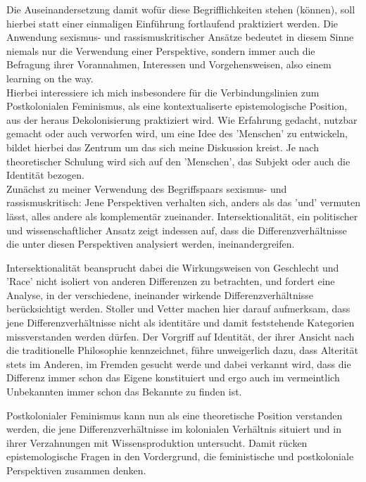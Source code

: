 Die Auseinandersetzung damit wofür diese
Begrifflichkeiten stehen (können), soll hierbei statt einer einmaligen
Einführung fortlaufend praktiziert werden. Die Anwendung sexismus- und
rassismuskritischer Ansätze bedeutet in diesem Sinne niemals nur die Verwendung
einer Perspektive, sondern immer auch die Befragung ihrer Vorannahmen,
Interessen und Vorgehensweisen, also einem learning on the way. \\
Hierbei
interessiere ich mich insbesondere für die Verbindungslinien zum Postkolonialen
Feminismus, als eine kontextualiserte epistemologische Position, aus der heraus
Dekolonisierung praktiziert wird. Wie Erfahrung gedacht, nutzbar gemacht oder
auch verworfen wird, um eine Idee des 'Menschen' zu entwickeln, bildet hierbei
das Zentrum um das sich meine Diskussion kreist. Je nach theoretischer Schulung
wird sich auf den 'Menschen', das Subjekt oder auch die Identität bezogen.
\\
Zunächst zu meiner Verwendung des Begriffspaars sexismus- und
rassismuskritisch: Jene Perspektiven verhalten sich, anders als das 'und'
vermuten lässt, alles andere als komplementär zueinander. Intersektionalität,
ein politischer und wissenschaftlicher Ansatz zeigt indessen auf, dass die
Differenzverhältnisse die unter diesen Perspektiven analysiert werden,
ineinandergreifen.

Intersektionalität beansprucht dabei die Wirkungsweisen von Geschlecht und
'Race' nicht isoliert von anderen Differenzen zu betrachten, und fordert eine
Analyse, in der verschiedene, ineinander wirkende Differenzverhältnisse
berücksichtigt werden. Stoller und Vetter machen hier darauf aufmerksam, dass
jene Differenzverhältnisse nicht als identitäre und damit feststehende
Kategorien missverstanden werden dürfen. Der Vorgriff auf Identität, der ihrer
Ansicht nach die traditionelle Philosophie kennzeichnet, führe unweigerlich
dazu, dass Alterität stets im Anderen, im Fremden gesucht werde und dabei
verkannt wird, dass die Differenz immer schon das Eigene konstituiert und ergo
auch im vermeintlich Unbekannten \glqq immer schon das Bekannte zu finden ist.\grqq
\footnotemark {}

Postkolonialer Feminismus kann nun als eine theoretische Position verstanden
werden, die jene Differenzverhältnisse im kolonialen Verhältnis situiert und in
ihrer Verzahnungen mit Wissensproduktion untersucht. Damit rücken
epistemologische Fragen in den Vordergrund, die feministische und postkoloniale
Perspektiven zusammen denken.

